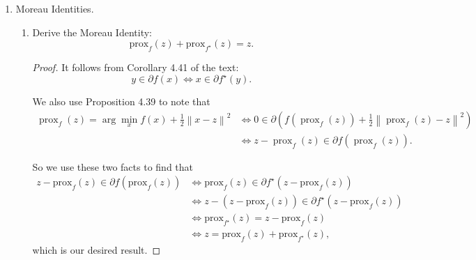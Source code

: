 \documentclass[11pt]{amsart}
\begin{document}
\begin{enumerate}
\begin{enumerate}
\begin{proof}
    Noting that the conjugate of $\|x\|^2/2$ is itself, we can apply part (b) to
    obtain
    $h_z^\star(x) = \frac{1}{2}\|x\|^2 + \left\langle x, z\right\rangle - g(z)$.

    Applying the results of part (c), we have that
    \begin{equation*}
      f^\star\left(x\right)
      = \sup_z \left\{\frac{1}{2}\|x\|^2 + \left\langle x, z\right\rangle - g(z)\right\}
      = \boxed{\frac{1}{2}\|x\|^2 + g^\star(x).}
    \end{equation*}    
  \end{proof}
\end{enumerate}

\bigskip\bigskip

\item Moreau Identities.
\begin{enumerate}
\item  Derive the Moreau Identity: 
\[
\mbox{prox}_{f}(z) + \mbox{prox}_{f^\star}(z) = z. 
\]

\begin{proof}
  It follows from Corollary 4.41 of the text:
  \begin{equation*}
    y \in \partial f (x) \Leftrightarrow x \in \partial f^\star(y).
  \end{equation*}

  We also use Proposition 4.39 to note that
  \begin{align*}
    \operatorname{prox}_{f}(z) = \arg\min_x f(x) + \frac{1}{2}\left\|x - z\right\|^2
    &\Leftrightarrow 0 \in \partial \left(
      f\left(\operatorname{prox}_{f}(z)\right) + \frac{1}{2}\left\|\operatorname{prox}_{f}(z) - z\right\|^2\right) \\
    &\Leftrightarrow
      z - \operatorname{prox}_{f}(z) \in \partial f\left(\operatorname{prox}_{f}(z)\right).
  \end{align*}
  
  So we use these two facts to find that
  \begin{align*}
    z - \mbox {prox}_{f}(z) \in \partial f \left(\mbox{prox}_{f}(z)\right)
    &\Leftrightarrow \mbox{prox}_{f}(z) \in \partial f^\star
      \left(z - \mbox {prox}_{f}(z)\right)\\
    &\Leftrightarrow
      z - \left(z - \mbox{prox}_{f}(z)\right) \in \partial f^\star
      \left(z - \mbox{prox}_{f}(z)\right) \\
    &\Leftrightarrow
      \mbox{prox}_{f^\star}(z) = z - \mbox{prox}_{f}(z) \\
    &\Leftrightarrow z = \mbox{prox}_{f}(z) + \mbox{prox}_{f^\star}(z),
  \end{align*}
  which is our desired result.
  

\end{proof}
\end{enumerate}
\end{enumerate}
\end{document}
